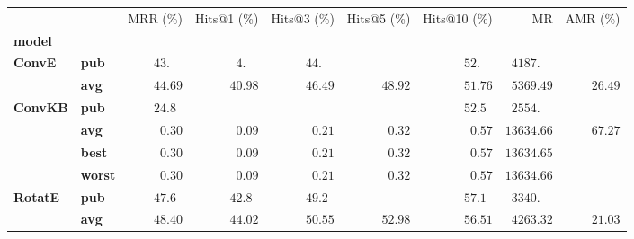 \begin{tabular}{llrrrrrrr}
\toprule
       &     &           MRR (\%) &                  Hits@1 (\%) &        Hits@3 (\%) &        Hits@5 (\%) &       Hits@10 (\%) &                              MR & AMR (\%) \\
\textbf{model} & {} &                    &                              &                    &                    &                    &                                 &          \\
\midrule
\textbf{ConvE} & \textbf{pub} &  $43.\phantom{00}$ &  $\phantom{0}4.\phantom{00}$ &  $44.\phantom{00}$ &                    &  $52.\phantom{00}$ &  $\phantom{0}4187.\phantom{00}$ &          \\
       & \textbf{avg} &            $44.69$ &                      $40.98$ &            $46.49$ &            $48.92$ &            $51.76$ &            $\phantom{0}5369.49$ &  $26.49$ \\
\textbf{ConvKB} & \textbf{pub} &  $24.8\phantom{0}$ &                              &                    &                    &  $52.5\phantom{0}$ &  $\phantom{0}2554.\phantom{00}$ &          \\
       & \textbf{avg} &  $\phantom{0}0.30$ &            $\phantom{0}0.09$ &  $\phantom{0}0.21$ &  $\phantom{0}0.32$ &  $\phantom{0}0.57$ &                      $13634.66$ &  $67.27$ \\
       & \textbf{best} &  $\phantom{0}0.30$ &            $\phantom{0}0.09$ &  $\phantom{0}0.21$ &  $\phantom{0}0.32$ &  $\phantom{0}0.57$ &                      $13634.65$ &          \\
       & \textbf{worst} &  $\phantom{0}0.30$ &            $\phantom{0}0.09$ &  $\phantom{0}0.21$ &  $\phantom{0}0.32$ &  $\phantom{0}0.57$ &                      $13634.66$ &          \\
\textbf{RotatE} & \textbf{pub} &  $47.6\phantom{0}$ &            $42.8\phantom{0}$ &  $49.2\phantom{0}$ &                    &  $57.1\phantom{0}$ &  $\phantom{0}3340.\phantom{00}$ &          \\
       & \textbf{avg} &            $48.40$ &                      $44.02$ &            $50.55$ &            $52.98$ &            $56.51$ &            $\phantom{0}4263.32$ &  $21.03$ \\
\bottomrule
\end{tabular}

